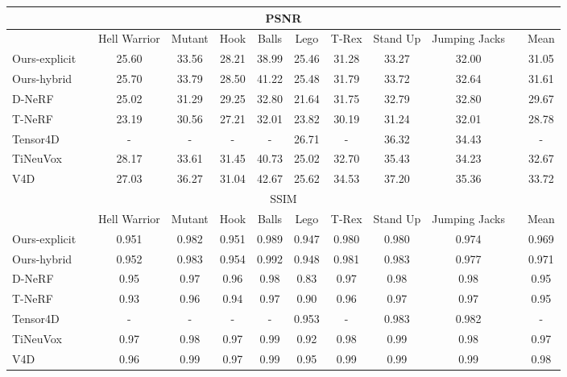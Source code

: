 \documentclass[10pt,twocolumn,letterpaper]{article}
\begin{document}
\renewcommand{\tabcolsep}{6pt}
\begin{table*}
  \centering
  \begin{tabular}{llcccccccclc}
    \multicolumn{12}{c}{PSNR } \\
    \toprule
     & & Hell Warrior & Mutant & Hook & Balls  & Lego & T-Rex & Stand Up & Jumping Jacks & & Mean \\ 
     \cmidrule(){1-1} \cmidrule(){3-10} \cmidrule(){12-12}
Ours-explicit && 25.60 &	33.56 &	28.21 &	38.99 &	25.46 &	31.28 &	33.27 &	32.00 &&	31.05 \\
     Ours-hybrid && 25.70 &	33.79 &	28.50 &	41.22 &	25.48 &	31.79 &	33.72 &	32.64 &&	31.61 \\
D-NeRF \cite{dnerf} && 25.02 & 31.29	& 29.25 & 32.80	& 21.64	& 31.75 &	32.79 &	32.80 &&	29.67 \\
    T-NeRF \cite{dnerf} &&	23.19 &	30.56 &	27.21 &	32.01	& 23.82 &	30.19 &	31.24 &	32.01 &&	28.78 \\
Tensor4D \cite{tensor4d} && - & - & - & - &	26.71 &	- & 36.32	& 34.43 &&	- \\
TiNeuVox \cite{tineuvox} && 28.17	& 33.61 &	31.45 &	40.73 &	25.02 &	32.70 &	35.43 &	34.23 &&	32.67 \\
V4D \cite{v4d}	&& 27.03	& 36.27 &	31.04 &	42.67 &	25.62 &	34.53 &	37.20 &	35.36 &&	33.72 \\
    \bottomrule
    \multicolumn{12}{c}{SSIM } \\
    \toprule
     & & Hell Warrior & Mutant & Hook & Balls  & Lego & T-Rex & Stand Up & Jumping Jacks & & Mean \\ 
     \cmidrule(){1-1} \cmidrule(){3-10} \cmidrule(){12-12}
Ours-explicit && 0.951 &	0.982 &	0.951 &	0.989 &	0.947 &	0.980 &	0.980 &	0.974 &&	0.969 \\
     Ours-hybrid && 0.952 &	0.983 &	0.954 &	0.992 &	0.948 &	0.981 &	0.983 &	0.977 &&	0.971 \\
D-NeRF \cite{dnerf} && 0.95 &	0.97 &	0.96 &	0.98 &	0.83 &	0.97 &	0.98 &	0.98 &&	0.95 \\
    T-NeRF \cite{dnerf} &&	0.93 &	0.96 &	0.94 &	0.97 &	0.90 &	0.96 &	0.97 &	0.97 &&	0.95 \\
Tensor4D \cite{tensor4d} && - & - & - & - &	0.953 &	- & 0.983 & 0.982 &&	- \\
TiNeuVox \cite{tineuvox} && 0.97 &	0.98 &	0.97 &	0.99 &	0.92 &	0.98 &	0.99 &	0.98 &&	0.97 \\
V4D \cite{v4d}	&& 0.96 &	0.99 &	0.97 &	0.99 &	0.95	& 0.99	& 0.99	& 0.99	&& 0.98 \\
    \bottomrule

\end{tabular}
\end{table*}
\end{document}
